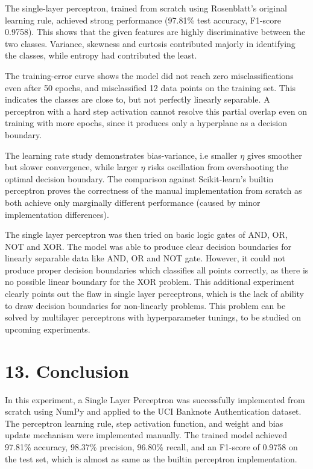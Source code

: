 \documentclass[11pt]{article}
\begin{document}
The single-layer perceptron, trained from scratch using Rosenblatt's original learning rule, achieved strong performance  (97.81\% test accuracy, F1-score 0.9758). This shows that the given features are highly discriminative between the two classes. Variance, skewness and curtosis contributed majorly in identifying the classes, while entropy had contributed the least.

The training-error curve shows the model did not reach zero misclassifications even after 50 epochs, and misclassified 12 data points on the training set. This indicates the classes are close to, but not perfectly linearly separable. A perceptron with a hard step activation cannot resolve this partial overlap even on training with more epochs, since it produces only a hyperplane as a decision boundary.

The learning rate study demonstrates bias-variance, i.e smaller $\eta$ gives smoother but slower convergence, while larger $\eta$ risks oscillation from overshooting the optimal decision boundary. The comparison against Scikit-learn's builtin perceptron proves the correctness of the manual implementation from scratch as both achieve only marginally different performance (caused by minor implementation differences).

The single layer perceptron was then tried on basic logic gates of AND, OR, NOT and XOR. The model was able to produce clear decision boundaries for linearly separable data like AND, OR and NOT gate. However, it could not produce proper decision boundaries which classifies all points correctly, as there is no possible linear boundary for the XOR problem. This additional experiment clearly points out the flaw in single layer perceptrons, which is the lack of ability to draw decision boundaries for non-linearly problems. This problem can be solved by multilayer perceptrons with hyperparameter tunings, to be studied on upcoming experiments.\\


\section*{13. Conclusion}

In this experiment, a Single Layer Perceptron was successfully implemented from scratch using NumPy and applied to the UCI Banknote Authentication dataset. The perceptron learning rule, step activation function, and weight and bias update mechanism were implemented manually. The trained model achieved 97.81\% accuracy, 98.37\% precision, 96.80\% recall, and an F1-score of 0.9758 on the test set, which is almost as same as the builtin perceptron implementation. 
\end{document}
